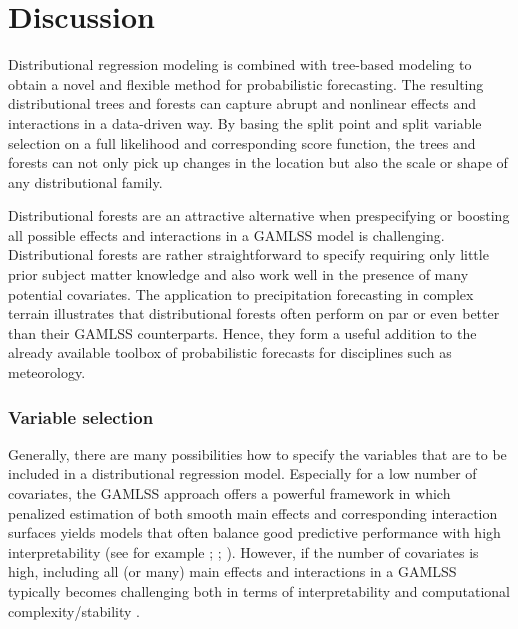 \documentclass[aoas, preprint]{imsart}
\numberwithin{equation}{subsection}
\begin{document}
\section{Discussion}
\label{sec:discussion}

Distributional regression modeling is combined with tree-based modeling
to obtain a novel and flexible method for probabilistic forecasting.
The resulting distributional trees and forests can capture abrupt and
nonlinear effects and interactions in a data-driven way. By basing the
split point and split variable selection on a full likelihood and
corresponding score function, the trees and forests can not only pick
up changes in the location but also the scale or shape of any distributional
family.

Distributional forests are an attractive alternative when prespecifying or
boosting all possible effects and interactions in a GAMLSS model is
challenging.  Distributional forests are rather straightforward to specify
requiring only little prior subject matter knowledge and also work well in the
presence of many potential covariates. The application to precipitation
forecasting in complex terrain illustrates that distributional forests often
perform on par or even better than their GAMLSS counterparts. Hence, they form
a useful addition to the already available toolbox of probabilistic forecasts
for disciplines such as meteorology.

\subsubsection*{Variable selection}

Generally, there are many possibilities how to specify the variables that are
to be included in a distributional regression model. Especially for a low number
of covariates, the GAMLSS approach offers a powerful framework in which
penalized estimation of both smooth main effects and corresponding interaction surfaces
yields models that often balance good predictive performance with high
interpretability (see for example \citealp{Wood+Scheipl+Faraway:2013}; 
\citealp{Goicoa+Adin+Ugarte:2018}; \citealp{Ugarte+Adin+Goicoa:2017}).
However, if the number of covariates is high, including all (or many)
main effects and interactions in a GAMLSS typically becomes challenging both in terms
of interpretability and computational complexity/stability
\citep[see also][]{Hofner+Mayr+Schmid:2016}.
\end{document}
